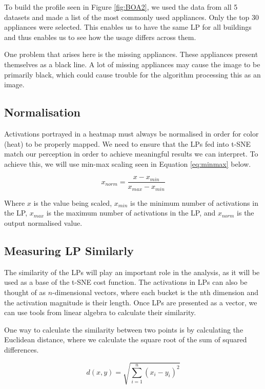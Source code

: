 To build the profile seen in Figure \ref{fig:BOA2}, we used the data from all 5 datasets and made a list of the most commonly used appliances.
Only the top 30 appliances were selected.
This enables us to have the same LP for all buildings and thus enables us to see how the usage differs across them.

One problem that arises here is the missing appliances.
These appliances present themselves as a black line.
A lot of missing appliances may cause the image to be primarily black, 
which could cause trouble for the algorithm processing this as an image.

\subsection{Normalisation}
\label{ssec:norm}
Activations portrayed in a heatmap must always be normalised in order for color (heat) to be properly mapped.
We need to ensure that the LPs fed into t-SNE match our perception in order to achieve meaningful results we can interpret.
To achieve this, we will use min-max scaling seen in Equation \ref{eq:minmax} below.

\begin{equation}
	\label{eq:minmax}
	x_{norm} = \frac{x - x_{min}}{x_{max} - x_{min}}
\end{equation}
	
 Where $x$ is the value being scaled, $x_{min}$ is the minimum number of activations in the LP, $x_{max}$ is the maximum number of activations in the LP, and $x_{norm}$ is the output normalised value.

\subsection{Measuring LP Similarly}
\label{ssec:lp_similarity}
The similarity of the LPs will play an important role in the analysis, as it will be used as a base of the t-SNE cost function.
The activations in LPs can also be thought of as $n$-dimensional vectors, where each bucket is the nth dimension and the activation magnitude is their length.
Once LPs are presented as a vector, we can use tools from linear algebra to calculate their similarity.

One way to calculate the similarity between two points is by calculating the Euclidean distance, 
where we calculate the square root of the sum of squared differences.

\begin{equation}
	\label{eq:euclidian_distance}
	d(x, y) = \sqrt{\sum_{i=1}^{n} (x_i - y_i)^2}
\end{equation}

